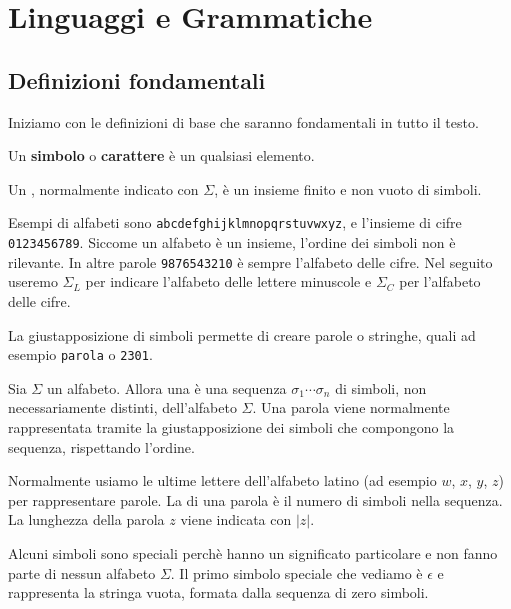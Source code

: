 \setchapterpreamble[u]{\margintoc}
\chapter{Linguaggi e Grammatiche}




\section{Definizioni fondamentali}

Iniziamo con le definizioni di base che saranno fondamentali in tutto il testo.

Un \textbf{simbolo} o \textbf{carattere} è un qualsiasi elemento.


\begin{definition}\label{def:alfabeto}
Un , normalmente indicato con $\Sigma$, è un insieme finito e non vuoto di simboli.
\end{definition}

Esempi di alfabeti sono \texttt{abcdefghijklmnopqrstuvwxyz}, e l'insieme di cifre \texttt{0123456789}.
Siccome un alfabeto è un insieme, l'ordine dei simboli non è rilevante.
In altre parole \texttt{9876543210} è sempre l'alfabeto delle cifre.
Nel seguito useremo $\Sigma_{L}$ per indicare l'alfabeto delle lettere minuscole e
$\Sigma_{C}$ per l'alfabeto delle cifre.


La giustapposizione di simboli permette di creare parole o stringhe, quali ad
esempio \texttt{parola} o \texttt{2301}.

\begin{definition}\label{def:parola}
Sia $\Sigma$ un alfabeto.
Allora una  è una sequenza $\sigma_{1}\cdots\sigma_{n}$ di simboli, non necessariamente
distinti, dell'alfabeto $\Sigma$.
Una parola viene normalmente rappresentata tramite la giustapposizione dei
simboli che compongono la sequenza, rispettando l'ordine.
\end{definition}

Normalmente usiamo le ultime lettere dell'alfabeto latino (ad esempio $w$, $x$,
$y$, $z$) per rappresentare parole.
La  di una parola è il numero di simboli nella sequenza.
La lunghezza della parola $z$ viene indicata con $|z|$.

Alcuni simboli sono speciali perchè hanno un significato particolare e non fanno parte di nessun alfabeto $\Sigma$.
Il primo simbolo speciale che vediamo è $\epsilon$ e rappresenta la stringa vuota,
formata dalla sequenza di zero simboli.

